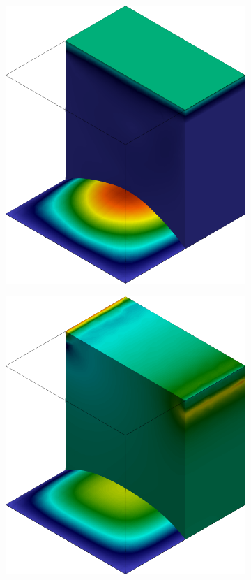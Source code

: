 \begin{figure}[h!]
\begin{subfigure}[b]{0.23\textwidth}
    \end{subfigure}
    \begin{subfigure}[b]{0.23\textwidth}
        \includegraphics[width=\linewidth]{Figuras/FSI-Cavity3D/u6.png}
    \end{subfigure}
    \caption*{$t=6,0$}
    \begin{subfigure}[b]{0.23\textwidth}
        \includegraphics[width=\linewidth]{Figuras/FSI-Cavity3D/p21-8.png}

\end{subfigure}
\end{figure}
